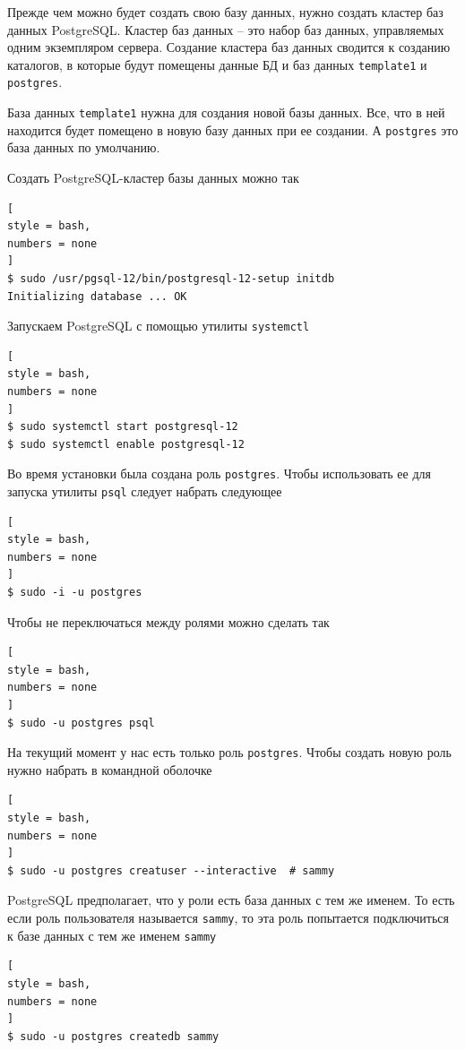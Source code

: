 \documentclass[%
	11pt,
	a4paper,
	utf8,
		]{article}
\begin{document}
Прежде чем можно будет создать свою базу данных, нужно создать кластер баз данных PostgreSQL. Кластер баз данных -- это набор баз данных, управляемых одним экземпляром сервера. Создание кластера баз данных сводится к созданию каталогов, в которые будут помещены данные БД и баз данных \verb|template1| и \verb|postgres|.

База данных \verb|template1| нужна для создания новой базы данных. Все, что в ней находится будет помещено в новую базу данных при ее создании. А \verb|postgres| это база данных по умолчанию.

Создать PostgreSQL-кластер базы данных можно так
\begin{lstlisting}[
style = bash,
numbers = none
]
$ sudo /usr/pgsql-12/bin/postgresql-12-setup initdb
Initializing database ... OK
\end{lstlisting}

Запускаем PostgreSQL с помощью утилиты \verb|systemctl|
\begin{lstlisting}[
style = bash,
numbers = none	
]
$ sudo systemctl start postgresql-12 
$ sudo systemctl enable postgresql-12
\end{lstlisting}

Во время установки была создана роль \verb|postgres|. Чтобы использовать ее для запуска утилиты \verb|psql| следует набрать следующее
\begin{lstlisting}[
style = bash,
numbers = none
]
$ sudo -i -u postgres
\end{lstlisting}

Чтобы не переключаться между ролями можно сделать так
\begin{lstlisting}[
style = bash,
numbers = none	
]
$ sudo -u postgres psql
\end{lstlisting}

На текущий момент у нас есть только роль \verb|postgres|. Чтобы создать новую роль нужно набрать в командной оболочке
\begin{lstlisting}[
style = bash,
numbers = none
]
$ sudo -u postgres creatuser --interactive  # sammy
\end{lstlisting}

PostgreSQL предполагает, что у роли есть база данных с тем же именем. То есть если роль пользователя называется \verb|sammy|, то эта роль попытается подключиться к базе данных с тем же именем \verb|sammy|
\begin{lstlisting}[
style = bash,
numbers = none
]
$ sudo -u postgres createdb sammy
\end{lstlisting}
\end{document}
